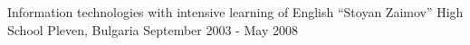 

\begin{cventries}

  \cventry
    {Information technologies with intensive learning of English} %
    {``Stoyan Zaimov'' High School} %
    {Pleven, Bulgaria} %
    {September 2003 - May 2008} %
    {}

\end{cventries}
